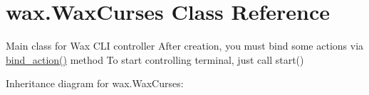 \hypertarget{classwax_1_1WaxCurses}{}\section{wax.\+Wax\+Curses Class Reference}
\label{classwax_1_1WaxCurses}


Main class for Wax C\+LI controller After creation, you must bind some actions via \hyperlink{classwax_1_1WaxInterface_a73ce2105c19b4f36ccc3360659582201}{bind\+\_\+action()} method To start controlling terminal, just call start()  




Inheritance diagram for wax.\+Wax\+Curses\+:
